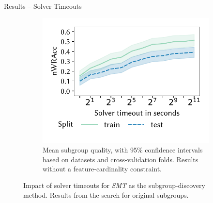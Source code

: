 \documentclass[en, navbaroff, handout]{sdqbeamer}
\begin{document}
\begin{frame}[t]{Results -- Solver Timeouts}
\begin{figure}
\begin{subfigure}[t]{0.32\textwidth}
			\centering
			\includegraphics[width=\textwidth, trim=10 25 10 10, clip]{plots/csd-timeouts-nwracc.pdf}
			\caption{
				Mean subgroup quality, with 95\% confidence intervals based on datasets and cross-validation folds.
				Results without a feature-cardinality constraint.
			}
			\label{fig:csd:timeouts-nwracc}
		\end{subfigure}
		\caption*{
			Impact of solver timeouts for \emph{SMT} as the subgroup-discovery method.
			Results from the search for original subgroups.
		}
		\label{fig:csd:timeouts}
	\end{figure}
\end{frame}
\end{document}
